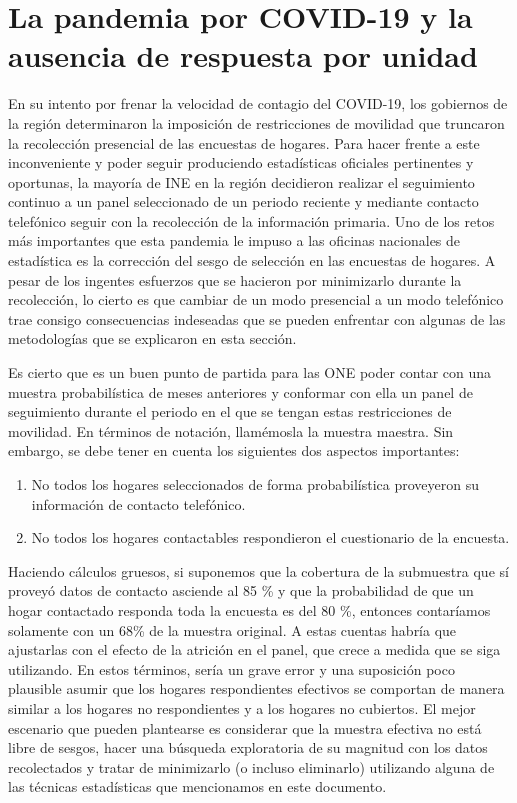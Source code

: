 \documentclass[
  10pt,
  spanish,
]{book}
\providecommand{\tightlist}{%
  \setlength{\itemsep}{0pt}\setlength{\parskip}{0pt}}
\begin{document}
\hypertarget{la-pandemia-por-covid-19-y-la-ausencia-de-respuesta-por-unidad}{%
\section{La pandemia por COVID-19 y la ausencia de respuesta por unidad}\label{la-pandemia-por-covid-19-y-la-ausencia-de-respuesta-por-unidad}}

En su intento por frenar la velocidad de contagio del COVID-19, los gobiernos de la región determinaron la imposición de restricciones de movilidad que truncaron la recolección presencial de las encuestas de hogares. Para hacer frente a este inconveniente y poder seguir produciendo estadísticas oficiales pertinentes y oportunas, la mayoría de INE en la región decidieron realizar el seguimiento continuo a un panel seleccionado de un periodo reciente y mediante contacto telefónico seguir con la recolección de la información primaria. Uno de los retos más importantes que esta pandemia le impuso a las oficinas nacionales de estadística es la corrección del sesgo de selección en las encuestas de hogares. A pesar de los ingentes esfuerzos que se hacieron por minimizarlo durante la recolección, lo cierto es que cambiar de un modo presencial a un modo telefónico trae consigo consecuencias indeseadas que se pueden enfrentar con algunas de las metodologías que se explicaron en esta sección.

Es cierto que es un buen punto de partida para las ONE poder contar con una muestra probabilística de meses anteriores y conformar con ella un panel de seguimiento durante el periodo en el que se tengan estas restricciones de movilidad. En términos de notación, llamémosla la muestra maestra. Sin embargo, se debe tener en cuenta los siguientes dos aspectos importantes:

\begin{enumerate}
\def\labelenumi{\arabic{enumi}.}
\tightlist
\item
  No todos los hogares seleccionados de forma probabilística proveyeron su información de contacto telefónico.
\item
  No todos los hogares contactables respondieron el cuestionario de la encuesta.
\end{enumerate}

Haciendo cálculos gruesos, si suponemos que la cobertura de la submuestra que sí proveyó datos de contacto asciende al 85 \% y que la probabilidad de que un hogar contactado responda toda la encuesta es del 80 \%, entonces contaríamos solamente con un 68\% de la muestra original. A estas cuentas habría que ajustarlas con el efecto de la atrición en el panel, que crece a medida que se siga utilizando. En estos términos, sería un grave error y una suposición poco plausible asumir que los hogares respondientes efectivos se comportan de manera similar a los hogares no respondientes y a los hogares no cubiertos. El mejor escenario que pueden plantearse es considerar que la muestra efectiva no está libre de sesgos, hacer una búsqueda exploratoria de su magnitud con los datos recolectados y tratar de minimizarlo (o incluso eliminarlo) utilizando alguna de las técnicas estadísticas que mencionamos en este documento.
\end{document}
